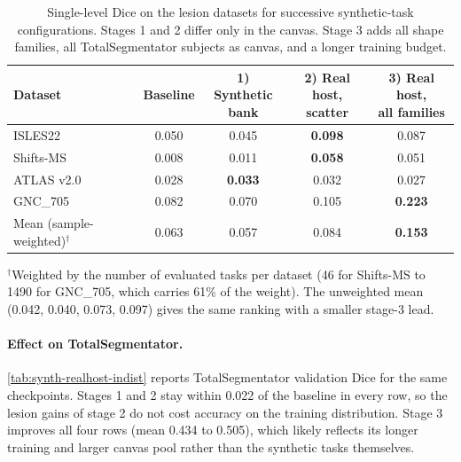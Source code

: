 \begin{table}[t]
  \centering
  \small
  \caption{Single-level Dice on the lesion datasets for successive
  synthetic-task configurations. Stages 1 and 2 differ only in the canvas.
  Stage 3 adds all shape families, all TotalSegmentator subjects as canvas,
  and a longer training budget.}
  \label{tab:synth-realhost-ood}
  \begin{tabular}{@{}lcccc@{}}
    \toprule
    Dataset & Baseline & \makecell{1) Synthetic\\bank} & \makecell{2) Real host,\\scatter} & \makecell{3) Real host,\\all families} \\
    \midrule
    ISLES22    & 0.050 & 0.045 & \textbf{0.098} & 0.087 \\
    Shifts-MS  & 0.008 & 0.011 & \textbf{0.058} & 0.051 \\
    ATLAS v2.0 & 0.028 & \textbf{0.033} & 0.032 & 0.027 \\
    GNC\_705   & 0.082 & 0.070 & 0.105 & \textbf{0.223} \\
    \midrule
    Mean (sample-weighted)$^{\dagger}$ & 0.063 & 0.057 & 0.084 & \textbf{0.153} \\
    \bottomrule
  \end{tabular}
  \par\vspace{0.5em}
  \raggedright\footnotesize
  $^{\dagger}$Weighted by the number of evaluated tasks per dataset (46 for
  Shifts-MS to 1490 for GNC\_705, which carries 61\% of the weight). The
  unweighted mean (0.042, 0.040, 0.073, 0.097) gives the same ranking with a
  smaller stage-3 lead.
\end{table}

\paragraph{Effect on TotalSegmentator.}
\autoref{tab:synth-realhost-indist} reports TotalSegmentator validation Dice
for the same checkpoints. Stages 1 and 2 stay within 0.022 of the baseline in
every row, so the lesion gains of stage 2 do not cost accuracy on the training
distribution. Stage 3 improves all four rows (mean 0.434 to 0.505), which
likely reflects its longer training and larger canvas pool rather than the
synthetic tasks themselves.


